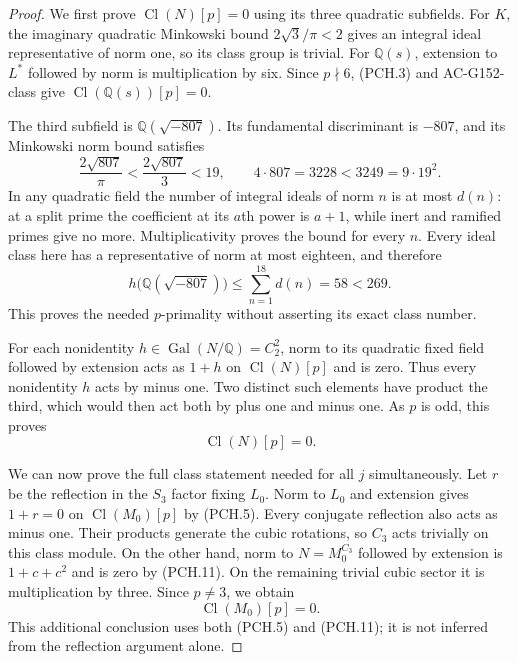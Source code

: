 \begin{proof}
We first prove $\operatorname{Cl}(N)[p]=0$ using its three
quadratic subfields.  For $K$, the imaginary quadratic Minkowski
bound $2\sqrt3/\pi<2$ gives an integral ideal representative of
norm one, so its class group is trivial.
For $\mathbb Q(s)$, extension to $L^*$ followed by norm is
multiplication by six.  Since $p\nmid6$, (PCH.3) and
AC-G152-class give $\operatorname{Cl}(\mathbb Q(s))[p]=0$.

The third subfield is $\mathbb Q(\sqrt{-807})$.
Its fundamental discriminant is $-807$, and its Minkowski norm
bound satisfies
\[
        \frac{2\sqrt{807}}\pi<\frac{2\sqrt{807}}3<19,
        \qquad 4\cdot807=3228<3249=9\cdot19^2.
 \tag{PCH.9}
\]
In any quadratic field the number of integral ideals of norm $n$
is at most $d(n)$: at a split prime the coefficient at its $a$th
power is $a+1$, while inert and ramified primes give no more.
Multiplicativity proves the bound for every $n$.
Every ideal class here has a representative of norm at most eighteen,
and therefore
\[
              h\bigl(\mathbb Q(\sqrt{-807})\bigr)
                     \leq\sum_{n=1}^{18}d(n)=58<269.
 \tag{PCH.10}
\]
This proves the needed $p$-primality without asserting its exact
class number.

For each nonidentity $h\in\operatorname{Gal}(N/\mathbb Q)=C_2^2$,
norm to its quadratic fixed field followed by extension acts as
$1+h$ on $\operatorname{Cl}(N)[p]$ and is zero.
Thus every nonidentity $h$ acts by minus one.
Two distinct such elements have product the third, which would
then act both by plus one and minus one.
As $p$ is odd, this proves
\[
                           \operatorname{Cl}(N)[p]=0.
 \tag{PCH.11}
\]

We can now prove the full class statement needed for all $j$
simultaneously.  Let $r$ be the reflection in the $S_3$ factor
fixing $L_0$.  Norm to $L_0$ and extension gives $1+r=0$ on
$\operatorname{Cl}(M_0)[p]$ by (PCH.5).
Every conjugate reflection also acts as minus one.
Their products generate the cubic rotations, so $C_3$ acts
trivially on this class module.
On the other hand, norm to $N=M_0^{C_3}$ followed by extension
is $1+c+c^2$ and is zero by (PCH.11).
On the remaining trivial cubic sector it is multiplication by three.
Since $p\ne3$, we obtain
\[
                         \operatorname{Cl}(M_0)[p]=0.
 \tag{PCH.12}
\]
This additional conclusion uses both (PCH.5) and (PCH.11);
it is not inferred from the reflection argument alone.


\end{proof}
